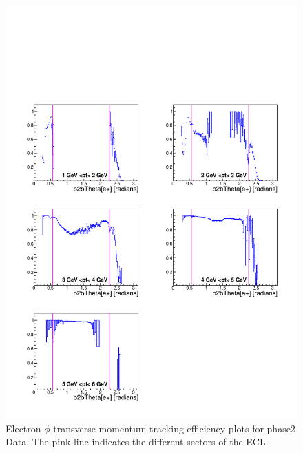 \documentclass[a4paper,11pt,twosided,final,german,openbib,pdftex,listof=totoc,bibliography=totoc]{scrbook}
\begin{document}
\begin{appendix}
\begin{figure}[!htbp]
	\centering
	\includegraphics[width=\textwidth]{Plots/master/xPtMThetaem_Data}
	\caption[Transverse Momentum $\theta$ Electron Efficiency Phase2 Data]{Electron $\phi$ transverse momentum tracking efficiency plots for phase2 Data. The pink line indicates the different sectors of the ECL.}
	\label{plt:PtMThetaem_Data}
\end{figure}





\end{appendix}
\end{document}
